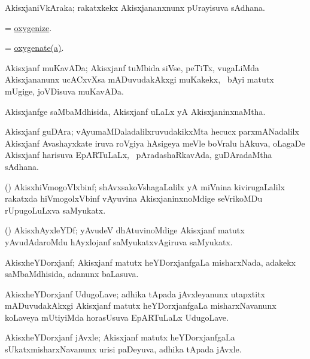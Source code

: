 \bentry
{}
\gl{\nA}
\bmng
AkisxjaniVkAraka; rakatxkekx Akisxjananxnunx pUrayisuva sAdhana. 
\emng
\eentry

\bentry
{}
\gl{\sakirx}
\bmng
= \hyperlink{oxygenize}{oxygenize}. 
\emng
\eentry

\bentry
{}
\gl{\sakirx}
\bmng
= \hyperlink{oxygenate(a)}{oxygenate(a)}. 
\emng
\eentry

\bentry
{}
\gl{\nA}
\bmng
Akisxjanf muKavADa; Akisxjanf tuMbida siVse, peTiTx, \mo vugaLiMda Akisxjananunx ucACxvXsa mADuvudakAkxgi muKakekx, \kanmu\ bAyi matutx mUgige, joVDisuva muKavADa. 
\emng
\eentry

\bentry
{}
\gl{\gu}
\bmng
Akisxjanfge saMbaMdhisida, Akisxjanf uLaLx yA AkisxjaninxnaMtha. 
\emng
\eentry

\bentry
{}
\gl{\nA}
\bmng
Akisxjanf guDAra; vAyumaMDaladalilxruvudakikxMta hecucx parxmANadalilx Akisxjanf Avashayxkate iruva roVgiya hAsigeya meVle boVralu hAkuva, oLagaDe Akisxjanf harisuva EpARTuLaLx, \sA\ pAradashaRkavAda, guDAradaMtha sAdhana. 
\emng
\eentry

\bentry
{}
\gl{\nA}
\bmng
(\jiVra) AkisxhiVmogoVlxbinf; shAvxsakoVshagaLalilx yA miVnina kivirugaLalilx rakatxda hiVmogolxVbinf vAyuvina AkisxjaninxnoMdige seVrikoMDu rUpugoLuLxva saMyukatx. 
\emng
\eentry

\bentry
{}
\gl{\nA}
\bmng
(\ravi) AkisxhAyxleYDf; yAvudeV dhAtuvinoMdige Akisxjanf matutx yAvudAdaroMdu hAyxlojanf saMyukatxvAgiruva saMyukatx. 
\emng
\eentry

\bentry
{}
\gl{\gu}
\bmng
AkisxheYDorxjanf; Akisxjanf matutx heYDorxjanfgaLa misharxNada, adakekx saMbaMdhisida, adanunx baLasuva. 
\emng
\eentry

\bentry
{}
\gl{\nA}
\bmng
AkisxheYDorxjanf UdugoLave; adhika tApada jAvxleyanunx utapxtitx mADuvudakAkxgi Akisxjanf matutx heYDorxjanfgaLa misharxNavanunx koLaveya mUtiyiMda horasUsuva EpARTuLaLx UdugoLave. 
\emng
\eentry

\bentry
{}
\gl{\nA}
\bmng
AkisxheYDorxjanf jAvxle; Akisxjanf matutx heYDorxjanfgaLa sUkatxmisharxNavanunx urisi paDeyuva, adhika tApada jAvxle. 
\emng
\eentry

